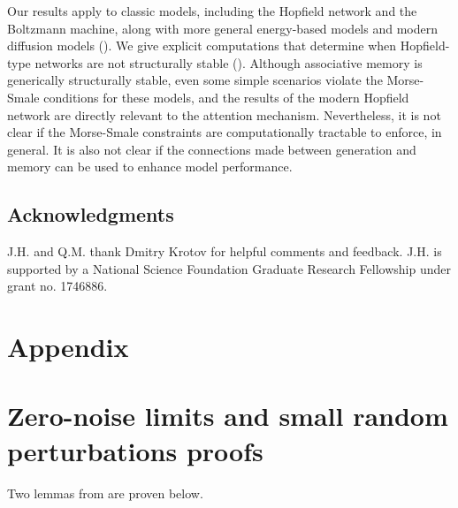 \documentclass[12pt]{article}
\begin{document}
Our results apply to classic models, including the Hopfield network and the Boltzmann machine, along with more general energy-based models and modern diffusion models (). We give explicit computations that determine when Hopfield-type networks are not structurally stable (). Although associative memory is generically structurally stable, even some simple scenarios violate the Morse-Smale conditions for these models, and the results of the modern Hopfield network are directly relevant to the attention mechanism. Nevertheless, it is not clear if the Morse-Smale constraints are computationally tractable to enforce, in general. It is also not clear if the connections made between generation and memory can be used to enhance model performance. 


\subsection*{Acknowledgments}
J.H. and Q.M. thank Dmitry Krotov for helpful comments and feedback. J.H. is supported by a National Science Foundation Graduate Research Fellowship under grant no. 1746886.

\newpage
\appendix
\section*{Appendix}

\section{Zero-noise limits and small random perturbations proofs}
\label{appendix:strict-isomorphism-weak-convergence}

Two lemmas from
 are proven below.
\end{document}
